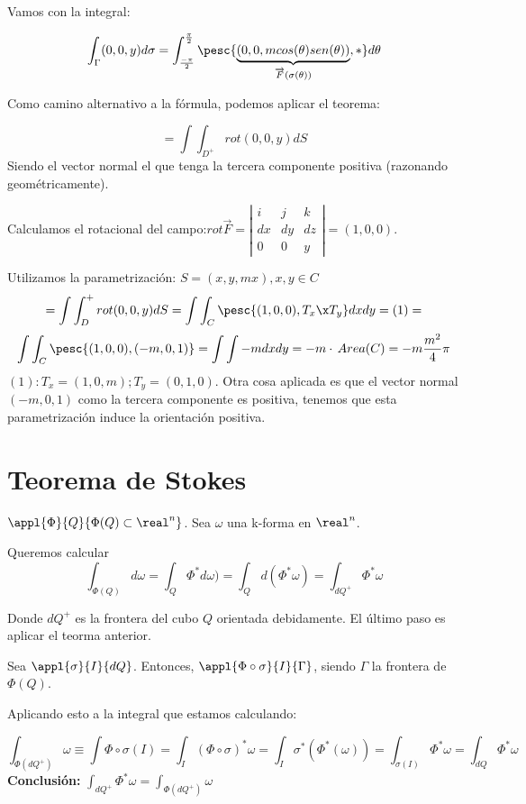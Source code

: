 Vamos con la integral:

\[\int_{\Gamma}(0,0,y) d\sigma =\int_{\frac{-\pi}{2}}^{\frac{\pi}{2}}\pesc{\underbrace{\left(0,0,mcos(\theta)sen(\theta)\right)}_{\overrightarrow{F}(\sigma(\theta))},\ast} d\theta\]

Como camino alternativo a la fórmula, podemos aplicar el teorema:

\[ = \int\int_{D^+}  rot(0,0,y)dS\] Siendo el vector normal el que tenga la tercera componente positiva (razonando geométricamente).

Calculamos el rotacional del campo:$rot\overrightarrow{F} =\left|\begin{matrix}
i&j&k\\dx&dy&dz\\0&0&y
\end{matrix}\right| = (1,0,0)$.

Utilizamos la parametrización: $S = (x,y,mx), x,y\in C$
\[ = \int\int_D^+ rot(0,0,y)dS = \int \int_C \pesc{(1,0,0) ,T_x\x T_y} dxdy= (1) =\]
\[ \int \int_C \pesc{(1,0,0),(-m,0,1)} = \int\int -m dxdy = -m \cdot \, Area (C) = -m\frac{m^2}{4}\pi \]
$(1): T_x = (1,0,m); T_y = (0,1,0) $. Otra cosa aplicada es que el vector normal $(-m,0,1)$ como la tercera componente es positiva, tenemos que esta parametrización induce la orientación positiva.


\section{Teorema de Stokes}



\label{StokesCeldas}
$\appl{\Phi}{Q}{\Phi(Q)\subset\real^n}$. Sea $\omega$ una k-forma en $\real^n$.

Queremos calcular \[
\int_{\Phi(Q)} d\omega = \int_Q \Phi^{\ast}d\omega) = \int_Q d(\Phi^{\ast}\omega) = \int_{dQ^{+}} \Phi^{\ast}\omega
\]

Donde $dQ^{+}$ es la frontera del cubo $Q$ orientada debidamente. El último paso es aplicar el teorma anterior.

Sea $\appl{\sigma}{I}{dQ}$. Entonces, $\appl{\Phi\circ\sigma}{I}{\Gamma}$, siendo $\Gamma$ la frontera de $\Phi(Q)$.

Aplicando esto a la integral que estamos calculando:

\[
\int_{\Phi(dQ^{+})} \omega \equiv \int{\Phi\circ\sigma(I)} = \int_I (\Phi\circ\sigma)^{\ast} \omega = \int_I \sigma^{\ast}\left(\Phi^{\ast}(\omega)\right) = \int_{\sigma(I)} \Phi^{\ast}\omega = \int_{dQ}\Phi^{\ast}\omega
\]
\textbf{Conclusión:} $\displaystyle \int_{dQ^+} \Phi^{\ast} \omega = \int_{\Phi(dQ^+)} \omega$


